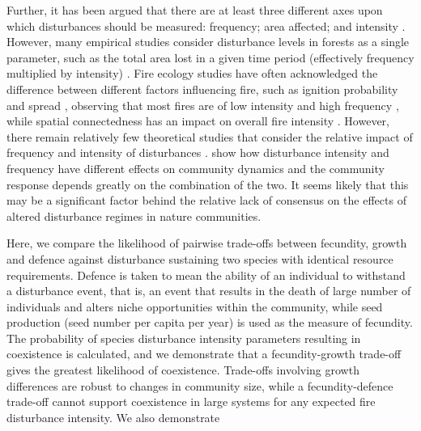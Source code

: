 \documentclass[a4paper]{article}
\begin{document}
Further, it has been argued that there are at least three different axes upon which disturbances should be measured: frequency; area affected; and intensity \citep{malanson1984intensity,miller1982community,sousa1984role}.  However, many empirical studies consider disturbance levels in forests as a single parameter, such as the total area lost in a given time period (effectively frequency multiplied by intensity) \citep[e.g.][]{molino2001tree,nakagawa2000impact,peterson1997tornado}. Fire ecology studies have often acknowledged the difference between different factors influencing fire, such as ignition probability and spread \citep[e.g.][]{kilgore1979fire,turner1994landscape}, observing that most fires are of low intensity and high frequency \citep{kilgore1979fire}, while spatial connectedness has an impact on overall fire intensity \citep{turner1994landscape}. However, there remain relatively few theoretical studies that consider the relative impact of frequency and intensity of disturbances \citep[but see ][]{miller2011frequency}. \cite{miller2011frequency} show how disturbance intensity and frequency have different effects on community dynamics and the community response depends greatly on the combination of the two. It seems likely that this may be a significant factor behind the relative lack of consensus on the effects of altered disturbance regimes in nature communities.


Here, we compare the likelihood of pairwise trade-offs between fecundity, growth and defence against disturbance sustaining two species with identical resource requirements. Defence is taken to mean the ability of an individual to withstand a disturbance event, that is, an event that results in the death of large number of individuals and alters niche opportunities within the community, while seed production (seed number per capita per year) is used as the measure of fecundity. The probability of species disturbance intensity parameters resulting in coexistence is calculated, and we demonstrate that a fecundity-growth trade-off gives the greatest likelihood of coexistence. Trade-offs involving growth differences are robust to changes in community size, while a fecundity-defence trade-off cannot support coexistence in large systems for any expected fire disturbance intensity. We also demonstrate
\end{document}
